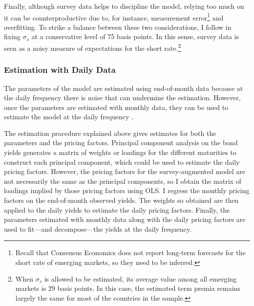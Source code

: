 {Finally, although survey data helps to discipline the model, relying too much on it can be counterproductive due to, for instance, measurement error\footnote{ Recall that Consensus Economics does not report long-term forecasts for the short rate of emerging markets, so they need to be inferred.} and overfitting. 
To strike a balance between these two considerations, I follow \cite{KimOrphanides:2012} in fixing \(\sigma_s\) at a conservative level of 75 basis points. 
In this sense, survey data is seen as a noisy measure of expectations for the short rate.\footnote{ When \(\sigma_s\) is allowed to be estimated, its average value among all emerging markets is 29 basis points.
In this case, the estimated term premia remains largely the same for most of the countries in the sample.}

\subsubsection{Estimation with Daily Data}
\iftoggle{toclinks}{\gototoc}{} %
The parameters of the model are estimated using end-of-month data because at the daily frequency there is noise that can undermine the estimation. 
However, once the parameters are estimated with monthly data, they can be used to estimate the model at the daily frequency \citep{ACM:2013}.

The estimation procedure explained above gives estimates for both the parameters and the pricing factors.
Principal component analysis on the bond yields generates a matrix of weights or loadings for the different maturities to construct each principal component, which could be used to estimate the daily pricing factors.
However, the pricing factors for the survey-augmented model are not necessarily the same as the principal components, so I obtain the matrix of loadings implied by those pricing factors using OLS.
I regress the monthly pricing factors on the end-of-month observed yields.
The weights so obtained are then applied to the daily yields to estimate the daily pricing factors.
Finally, the parameters estimated with monthly data along with the daily pricing factors are used to fit---and decompose---the yields at the daily frequency.

}
